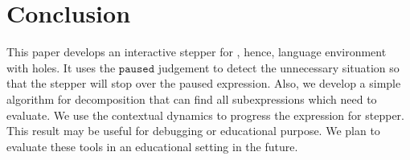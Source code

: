 \section{Conclusion}

This paper develops an interactive stepper for \Hazel, hence, language environment with holes. It uses the $\mathtt{paused}$ judgement to detect the unnecessary situation so that the stepper will stop over the paused expression. Also, we develop a simple algorithm for decomposition that can find all subexpressions which need to evaluate. We use the contextual dynamics to progress the expression for stepper. This result may be useful for debugging or educational purpose. We plan to evaluate these tools in an educational setting in the future.